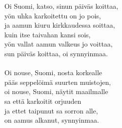 
Oi Suomi, katso, sinun päiväs koittaa, \\ yön uhka karkoitettu on jo pois, \\ ja aamun kiuru kirkkaudessa soittaa, \\ kuin itse taivahan kansi sois, \\ yön vallat aamun valkeus jo voittaa, \\ sun päiväs koittaa, oi synnyinmaa. \\ \hspace{10mm} \\ Oi nouse, Suomi, nosta korkealle \\ pääs seppelöimä suurten muistojen, \\ oi nouse, Suomi, näytit maailmalle \\ sa että karkoitit orjuuden \\ ja ettet taipunut sa sorron alle, \\ on aamus alkanut, synnyinmaa.